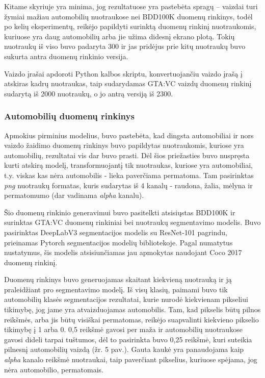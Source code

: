 \documentclass{VUMIFPSbakalaurinis}
\begin{document}
            Kitame skyriuje yra minima, jog rezultatuose yra pastebėta spragų – vaizdai turi žymiai mažiau automobilių nuotraukose nei BDD100K duomenų rinkinys, todėl po kelių eksperimentų, reikėjo papildyti surinktą duomenų rinkinį nuotraukomis, kuriuose yra daug automobilių arba jie užima didesnį ekrano plotą. Tokių nuotraukų iš viso buvo padaryta 300 ir jas pridėjus prie kitų nuotraukų buvo sukurta antra duomenų rinkinio versija.

            Vaizdo įrašai apdoroti Python kalbos skriptu, konvertuojančiu vaizdo įrašą į atskiras kadrų nuotraukas, taip sudarydamas GTA:VC vaizdų duomenų rinkinį sudarytą iš 2000 nuotraukų, o jo antrą versiją iš 2300.
        
        \subsubsection{Automobilių duomenų rinkinys}
            Apmokius pirminius modelius, buvo pastebėta, kad dingsta automobiliai ir nors vaizdo žaidimo duomenų rinkinys buvo papildytas nuotraukomis, kuriose yra automobilių, rezultatai vis dar buvo prasti. Dėl šios priežasties buvo nuspręsta kurti atskirą modelį, transformuojantį tik nuotraukas, kuriose yra automobiliai, t.y. viskas kas nėra automobilis - lieka paverčiama permatoma. Tam pasirinktas \emph{png} nuotraukų formatas, kuris sudarytas iš 4 kanalų - raudona, žalia, mėlyna ir permatomumo (dar vadinama \emph{alpha} kanalu).

            Šio duomenų rinkinio generavimui buvo pasitelkti atsisiųstas BDD100K ir surinktas GTA:VC duomenų rinkiniai bei nuotraukų segmentavimo modelis. Buvo pasirinktas DeepLabV3 segmentacijos modelis su ResNet-101 pagrindu, prieinamas Pytorch segmentacijos modelių bibliotekoje. Pagal numatytus nustatymus, šis modelis atsisiunčiamas jau apmokytas naudojant Coco 2017 duomenų rinkinį.

            Duomenų rinkinys buvo generuojamas skaitant kiekvieną nuotrauką ir ją praleidžiant pro segmentavimo modelį. Iš visų klasių, paimami buvo tik automobilių klasės segmentacijos rezultatai, kurie nurodė kiekvienam pikseliui tikimybę, jog jame yra atvaizduojamas automobilis. Tam, kad pikselis būtų pilnos reikšmės, arba jis būtų visiškai permatomas, reikėjo suapvalinti kiekvieno pikselio tikimybę į 1 arba 0. 0,5 reikšmė gavosi per maža ir automobilių nuotraukose gavosi dideli tarpai tuštumos, dėl to pasirinkta buvo 0,25 reikšmė, kuri suteikia pilnesnį automobilių vaizdą (žr. 5 pav.). Gauta kaukė yra panaudojama kaip \emph{alpha} kanalo reikšmė nuotraukai, taip paverčiant pikselius, kuriuose spėjama, jog nėra automobilio, permatomais.
\end{document}
